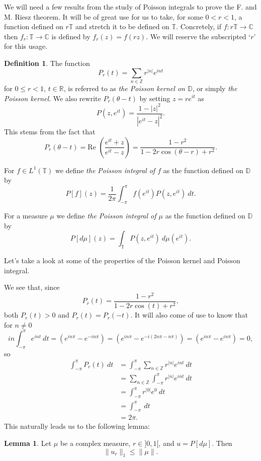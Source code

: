 \documentclass[a4paper,12pt,twoside,BCOR=10mm]{scrbook}
\theoremstyle{definition}
\theoremstyle{definition}
\newtheorem{lemma}[theorem]{Lemma}
\theoremstyle{definition}
\newtheorem{definition}[theorem]{Definition}
\renewcommand{\Re}{\text{Re }}
\begin{document}
We will need a few results from the study of Poisson integrals to prove the F. and M. Riesz theorem.
It will be of great use for us to take, for some $0 < r < 1$, a function defined on $r\mathbb{T}$ and stretch it to be defined on $\mathbb{T}$.
Concretely, if $f: r\mathbb{T} \rightarrow \mathbb{C}$ then $f_r: \mathbb{T} \rightarrow \mathbb{C}$ is defined by $f_r(z) = f(rz)$.
We will reserve the subscripted `$r$' for this usage.
\begin{definition}
The function
\[
	P_r(t) = \sum_{n \in \mathbb{Z}} r^{|n|}e^{int}
\]
for $0 \leq r < 1$, $t \in \mathbb{R}$, is referred to as \emph{the Poisson kernel on $\mathbb{D}$}, or simply \emph{the Poisson kernel}.
We also rewrite $P_r(\theta - t)$ by setting $z = re^{it}$ as
\[
	P(z, e^{it}) = \frac{1 - |z|^2}{|e^{it} - z|^2}.
\]
This stems from the fact that
\[
	P_r(\theta - t) = \Re \left ( \frac{e^{it} + z}{e^{it} - z}\right ) = \frac{1 - r^2}{1 - 2r\cos(\theta - r) + r^2}.
\]

For $f \in L^1(\mathbb{T})$ we define \emph{the Poisson integral of $f$} as the function defined on $\mathbb{D}$ by
\[
	P[f](z) = \frac{1}{2\pi} \int_{-\pi}^{\pi} f(e^{it})P(z, e^{it})\ dt.
\]

For a measure $\mu$ we define \emph{the Poisson integral of $\mu$} as the function defined on $\mathbb{D}$ by
\[
	P[d\mu](z) = \int_{\mathbb{T}} P(z, e^{it})\ d\mu(e^{it}).
\]

Let's take a look at some of the properties of the Poisson kernel and Poisson integral.
\end{definition}
We see that, since
\[
	P_r(t) = \frac{1 - r^2}{1 - 2r\cos(t) + r^2},
\]
both $P_r(t) > 0$ and $P_r(t) = P_r(-t)$.
It will also come of use to know that for $n \neq 0$
\[
	in\int_{-\pi}^{\pi} e^{int}\ dt
	= (e^{in\pi} - e^{-in\pi})
	= (e^{in\pi} - e^{-i(2n\pi - n\pi)})
	= (e^{in\pi} - e^{in\pi})
	= 0,
\]
so
\begin{align*}
	\int_{-\pi}^{\pi} P_r(t)\ dt
	&= \int_{-\pi}^{\pi} \sum_{n \in \mathbb{Z}} r^{|n|}e^{int}\ dt\\
	&= \sum_{n \in \mathbb{Z}} \int_{-\pi}^{\pi} r^{|n|}e^{int}\ dt\\
	&= \int_{-\pi}^{\pi} r^{|0|}e^{0}\ dt\\
	&= \int_{-\pi}^{\pi}\ dt\\
	&= 2\pi.
\end{align*}
This naturally leads us to the following lemma:
\begin{lemma}
\label{FMRlemma1}
Let $\mu$ be a complex measure, $r \in ]0, 1[$, and $u = P[d\mu]$.
Then
\[
	\|u_r\|_1 \leq \|\mu\|.
\]
\end{lemma}
\end{document}
